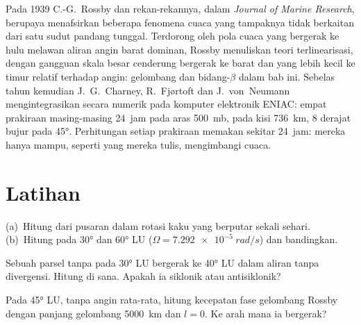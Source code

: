 \begin{history}
Pada 1939 C.-G.~Rossby dan rekan-rekannya, dalam \emph{Journal of Marine
Research}, berupaya menafsirkan beberapa fenomena cuaca yang tampaknya tidak berkaitan
dari satu sudut pandang tunggal. Terdorong oleh pola cuaca yang
bergerak ke hulu melawan aliran angin barat dominan, Rossby menuliskan
teori terlinearisasi, dengan gangguan skala besar cenderung bergerak ke barat
dan yang lebih kecil ke timur relatif terhadap angin: gelombang dan
bidang-$\beta$ dalam bab ini. Sebelas tahun kemudian J.~G.~Charney,
R.~Fjørtoft dan J.~von~Neumann mengintegrasikan 
secara numerik pada komputer elektronik ENIAC: empat prakiraan masing-masing 24~jam pada
aras \qty{500}{mb}, pada kisi \qty{736}{km}, 8 derajat bujur
pada \ang{45}. Perhitungan setiap prakiraan memakan sekitar 24~jam: mereka
hanya mampu, seperti yang mereka tulis, mengimbangi cuaca.
\end{history}

\section{Latihan}

\begin{exercise}[$\star$]\label{exo:b3:atmospheric-dynamics:1}
(a)~Hitung  dari pusaran dalam rotasi kaku yang berputar
sekali sehari. (b)~Hitung  pada \ang{30} dan \ang{60} LU
($\Omega = \qty{7.292e-5}{rad/s}$) dan bandingkan.
\end{exercise}

\begin{exercise}[$\star$]\label{exo:b3:atmospheric-dynamics:2}
Sebuah parsel tanpa  pada \ang{30} LU bergerak ke \ang{40} LU dalam
aliran tanpa divergensi. Hitung  di sana. Apakah ia
siklonik atau antisiklonik?
\end{exercise}

\begin{exercise}[$\star$]\label{exo:b3:atmospheric-dynamics:3}
Pada \ang{45} LU, tanpa angin rata-rata, hitung kecepatan fase gelombang Rossby
dengan panjang gelombang \qty{5000}{km} dan $l = 0$. Ke arah mana ia bergerak?
\end{exercise}

